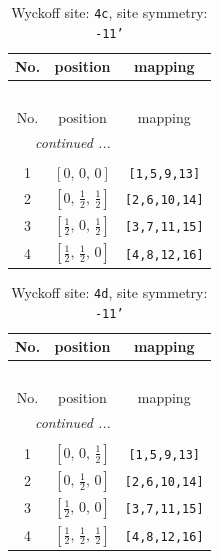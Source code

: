 \documentclass[fleqn,8pt]{jsarticle}
\begin{document}
\renewcommand{\arraystretch}{1.2}
\begin{longtable}{ccc}
\caption{Wyckoff site: {\tt 4c}, site symmetry: {\tt -11'}}
 \\
 \hline \hline
No. & position & mapping \\ \hline \endfirsthead

\multicolumn{2}{l}{\tablename\ \thetable{}} \\
 \hline \hline
No. & position & mapping \\ \hline \endhead

 \hline \hline
\multicolumn{2}{r}{\footnotesize\it continued ...} \\ \endfoot

 \hline \hline
\multicolumn{2}{r}{} \\ \endlastfoot

1 & $\left[ 0,\, 0,\, 0 \right]$ & {\tt [1,5,9,13]} \\ \hline
2 & $\left[ 0,\, \frac{1}{2},\, \frac{1}{2} \right]$ & {\tt [2,6,10,14]} \\ \hline
3 & $\left[ \frac{1}{2},\, 0,\, \frac{1}{2} \right]$ & {\tt [3,7,11,15]} \\ \hline
4 & $\left[ \frac{1}{2},\, \frac{1}{2},\, 0 \right]$ & {\tt [4,8,12,16]} \\
\end{longtable}
\renewcommand{\arraystretch}{1.2}
\begin{longtable}{ccc}
\caption{Wyckoff site: {\tt 4d}, site symmetry: {\tt -11'}}
 \\
 \hline \hline
No. & position & mapping \\ \hline \endfirsthead

\multicolumn{2}{l}{\tablename\ \thetable{}} \\
 \hline \hline
No. & position & mapping \\ \hline \endhead

 \hline \hline
\multicolumn{2}{r}{\footnotesize\it continued ...} \\ \endfoot

 \hline \hline
\multicolumn{2}{r}{} \\ \endlastfoot

1 & $\left[ 0,\, 0,\, \frac{1}{2} \right]$ & {\tt [1,5,9,13]} \\ \hline
2 & $\left[ 0,\, \frac{1}{2},\, 0 \right]$ & {\tt [2,6,10,14]} \\ \hline
3 & $\left[ \frac{1}{2},\, 0,\, 0 \right]$ & {\tt [3,7,11,15]} \\ \hline
4 & $\left[ \frac{1}{2},\, \frac{1}{2},\, \frac{1}{2} \right]$ & {\tt [4,8,12,16]} \\
\end{longtable}
\end{document}
